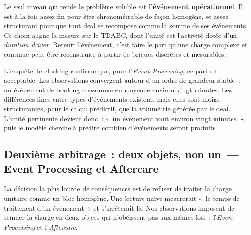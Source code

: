 Le seul niveau qui rende le problème soluble est l'\textbf{événement opérationnel}. Il est à la fois assez fin pour être chronométrable de façon homogène, et assez structurant pour que tout deal se recompose comme la somme de ses événements. Ce choix aligne la mesure sur le TDABC, dont l'unité est l'activité dotée d'un \textit{duration driver}. Retenir l'événement, c'est faire le pari qu'une charge complexe et continue peut être reconstruite à partir de briques discrètes et mesurables.

L'enquête de clocking confirme que, pour l'\textit{Event Processing}, ce pari est acceptable. Les observations convergent autour d'un ordre de grandeur stable~: un événement de booking consomme en moyenne environ vingt minutes. Les différences fines entre types d'événements existent, mais elles sont moins structurantes, pour le calcul prédictif, que la volumétrie générée par le deal. L'unité pertinente devient donc~: «~un événement vaut environ vingt minutes~», puis le modèle cherche à prédire combien d'événements seront produits.

\subsection{Deuxième arbitrage~: deux objets, non un~--- Event Processing et Aftercare}
\label{sec:arbitrage-decomposition}

La décision la plus lourde de conséquences est de refuser de traiter la charge unitaire comme un bloc homogène. Une lecture naïve mesurerait «~le temps de traitement d'un événement~» et s'arrêterait là. Nos observations imposent de scinder la charge en deux objets qui n'obéissent pas aux mêmes lois~: l'\textit{Event Processing} et l'\textit{Aftercare}.

